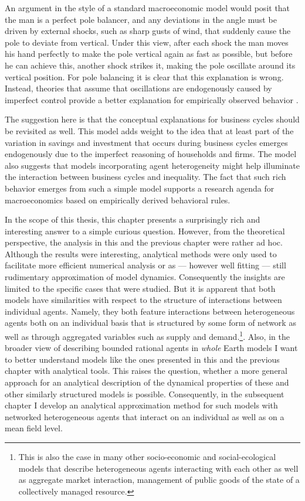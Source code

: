 An argument in the style of a standard macroeconomic model would posit that the man is a perfect pole balancer, and any deviations in the angle must be driven by external shocks, such as sharp gusts of wind, that suddenly cause the pole to deviate from vertical.  Under this view, after each shock the man moves his hand perfectly to make the pole vertical again as fast as possible, but before he can achieve this, another shock strikes it, making the pole oscillate around its vertical position.  For pole balancing it is clear that this explanation is wrong. Instead, theories that assume that oscillations are endogenously caused by imperfect control provide a better explanation for empirically observed behavior \citep{insperger2017stick}.

The suggestion here is that the conceptual explanations for business cycles should be revisited as well.  This model adds weight to the idea that at least part of the variation in savings and investment that occurs during business cycles emerges endogenously due to the imperfect reasoning of households and firms.  The model also suggests that models incorporating agent heterogeneity might help illuminate the interaction between business cycles and inequality.  The fact that such rich behavior emerges from such a simple model supports a research agenda for macroeconomics based on empirically derived behavioral rules.

In the scope of this thesis, this chapter presents a surprisingly rich and interesting answer to a simple curious question. However, from the theoretical perspective, the analysis in this and the previous chapter were rather ad hoc. Although the results were interesting, analytical methods were only used to facilitate more efficient numerical analysis or as --- however well fitting --- still rudimentary approximation of model dynamics. Consequently the insights are limited to the specific cases that were studied. But it is apparent that both models have similarities with respect to the structure of interactions between individual agents. Namely, they both feature interactions between heterogeneous agents both on an individual basis that is structured by some form of network as well as through aggregated variables such as supply and demand.\footnote{This is also the case in many other socio-economic and social-ecological models that describe heterogeneous agents interacting with each other as well as aggregate market interaction, management of public goods of the state of a collectively managed resource.}. Also, in the broader view of describing bounded rational agents in \emph{whole} Earth models I want to better understand models like the ones presented in this and the previous chapter with analytical tools. This raises the question, whether a more general approach for an analytical description of the dynamical properties of these and other similarly structured models is possible. Consequently, in the subsequent chapter I develop an analytical approximation method for such models with networked heterogeneous agents that interact on an individual as well as on a mean field level.
